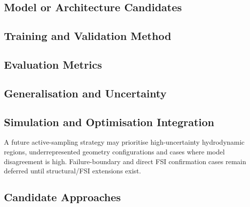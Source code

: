
\subsection{Model or Architecture Candidates}
\label{sec:res-ml-sur-model-architecture-candidates}


\subsection{Training and Validation Method}
\label{sec:res-ml-sur-training-validation-method}


\subsection{Evaluation Metrics}
\label{sec:res-ml-sur-evaluation-metrics}


\subsection{Generalisation and Uncertainty}
\label{sec:res-ml-sur-generalisation-uncertainty}


\subsection{Simulation and Optimisation Integration}
\label{sec:res-ml-sur-simulation-optimisation-integration}

A future active-sampling strategy may prioritise high-uncertainty
hydrodynamic regions, underrepresented geometry configurations and
cases where model disagreement is high. Failure-boundary and direct
FSI confirmation cases remain deferred until structural/FSI extensions
exist.

\subsection{Candidate Approaches}
\label{sec:res-ml-sur-candidate-approaches}


